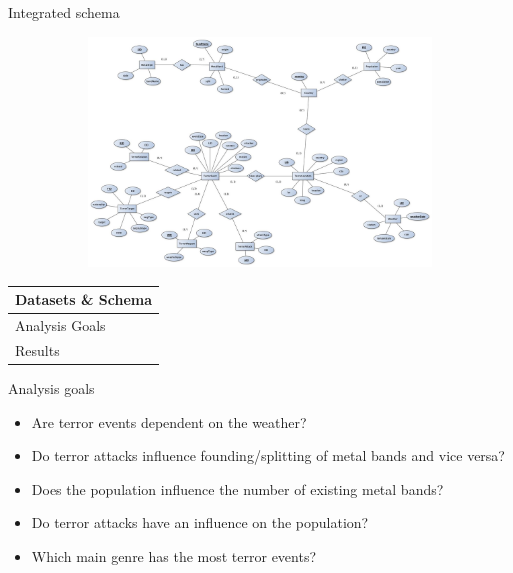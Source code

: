 \documentclass{beamer}
\begin{document}
\begin{frame}{Integrated schema}
	\begin{figure}
		\begin{subfigure}[b]{\textwidth}
			\includegraphics[width=\textwidth]{ER/g2-integratedSchema.jpg}
		\end{subfigure}
	\end{figure}
\end{frame}


\begin{frame}
	\begin{tabularx}{\textwidth}{X}
		\hline
		Datasets \& Schema\\
		\hline
		\rowcolor{hcolor}
		Analysis Goals\\
		\hline
		Results\\
		\hline
	\end{tabularx}
\end{frame}


\begin{frame}{Analysis goals}
	\begin{itemize}
		\item Are terror events dependent on the weather?
		\item Do terror attacks influence founding/splitting of metal bands and vice versa?
		\item Does the population influence the number of existing metal bands?
		\item Do terror attacks have an influence on the population?
		\item Which main genre has the most terror events?
	\end{itemize}
\end{frame}
\end{document}
